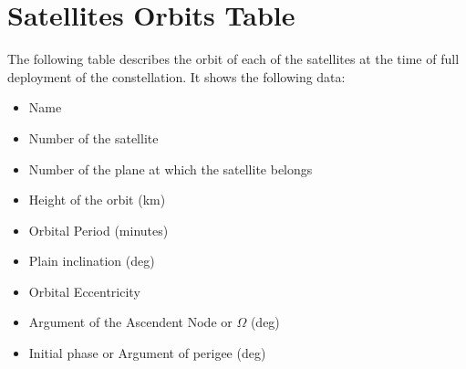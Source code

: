 \section{Satellites Orbits Table}

The following table describes the orbit of each of the satellites at the time of full deployment of the constellation. It shows the following data:

\begin{itemize}
\item Name
\item Number of the satellite
\item Number of the plane at which the satellite belongs
\item Height of the orbit (km)
\item Orbital Period (minutes)
\item Plain inclination (deg)
\item Orbital Eccentricity
\item Argument of the Ascendent Node or $\Omega$ (deg)
\item Initial phase or Argument of perigee (deg)
\end{itemize}

